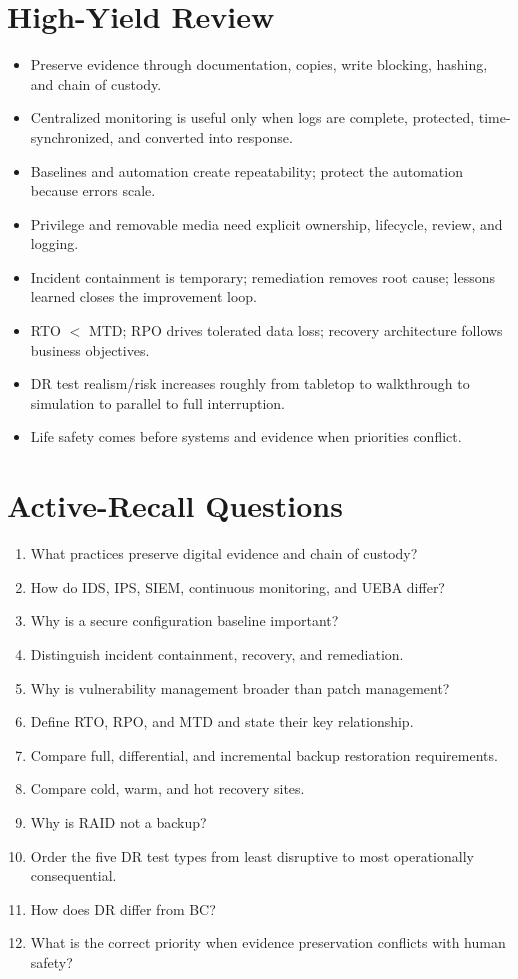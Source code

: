 \documentclass[10pt,letterpaper]{article}
\begin{document}
\section{High-Yield Review}
\begin{itemize}
\item Preserve evidence through documentation, copies, write blocking, hashing, and chain of custody.
\item Centralized monitoring is useful only when logs are complete, protected, time-synchronized, and converted into response.
\item Baselines and automation create repeatability; protect the automation because errors scale.
\item Privilege and removable media need explicit ownership, lifecycle, review, and logging.
\item Incident containment is temporary; remediation removes root cause; lessons learned closes the improvement loop.
\item RTO \(<\) MTD; RPO drives tolerated data loss; recovery architecture follows business objectives.
\item DR test realism/risk increases roughly from tabletop to walkthrough to simulation to parallel to full interruption.
\item Life safety comes before systems and evidence when priorities conflict.
\end{itemize}

\section{Active-Recall Questions}
\begin{enumerate}
\item What practices preserve digital evidence and chain of custody?
\item How do IDS, IPS, SIEM, continuous monitoring, and UEBA differ?
\item Why is a secure configuration baseline important?
\item Distinguish incident containment, recovery, and remediation.
\item Why is vulnerability management broader than patch management?
\item Define RTO, RPO, and MTD and state their key relationship.
\item Compare full, differential, and incremental backup restoration requirements.
\item Compare cold, warm, and hot recovery sites.
\item Why is RAID not a backup?
\item Order the five DR test types from least disruptive to most operationally consequential.
\item How does DR differ from BC?
\item What is the correct priority when evidence preservation conflicts with human safety?
\end{enumerate}
\end{document}
